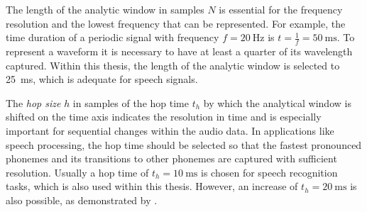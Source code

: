 The length of the analytic window in samples $N$ is essential for the frequency resolution and the lowest frequency that can be represented.
For example, the time duration of a periodic signal with frequency $f=\SI{20}{\hertz}$ is $t=\frac{1}{f} = \SI{50}{\milli\second}$.
To represent a waveform it is necessary to have at least a quarter of its wavelength captured.
Within this thesis, the length of the analytic window is selected to \SI{25}{\milli\second}, which is adequate for speech signals.

The \emph{hop size} $h$ in samples of the hop time $t_h$ by which the analytical window is shifted on the time axis indicates the resolution in time and is especially important for sequential changes within the audio data.
In applications like speech processing, the hop time should be selected so that the fastest pronounced phonemes and its transitions to other phonemes are captured with sufficient resolution.
Usually a hop time of $t_{h}=\SI{10}{\milli\second}$ is chosen for speech recognition tasks, which is also used within this thesis.
However, an increase of $t_{h}=\SI{20}{\milli\second}$ is also possible, as demonstrated by \cite{Peter2020ResourceEffDNN}.


